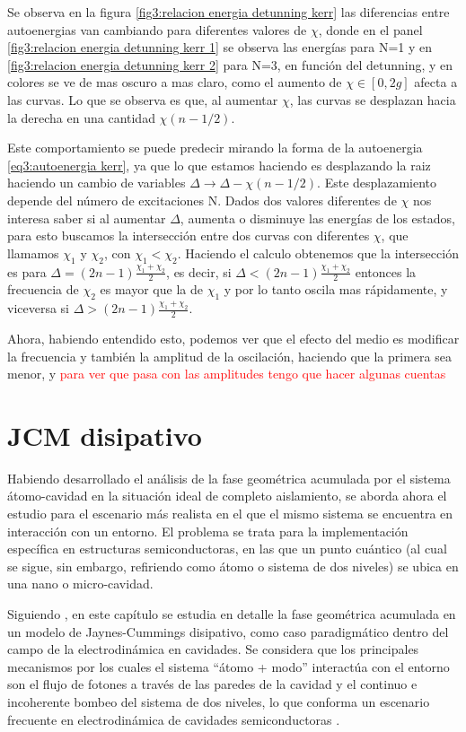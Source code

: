 Se observa en la figura \ref{fig3:relacion energia detunning kerr} las diferencias entre autoenergias van cambiando para diferentes valores de $\chi$, donde en el panel \ref{fig3:relacion energia detunning kerr 1} se observa las energías para N=1 y en \ref{fig3:relacion energia detunning kerr 2} para N=3, en función del detunning, y en colores se ve de mas oscuro a mas claro, como el aumento de $\chi \in [0,2g]$ afecta a las curvas. Lo que se observa es que, al aumentar $\chi$, las curvas se desplazan hacia la derecha en una cantidad $\chi(n-1/2)$. 

Este comportamiento se puede predecir mirando la forma de la autoenergia \ref{eq3:autoenergia kerr}, ya que lo que estamos haciendo es desplazando la raiz haciendo un cambio de variables $\Delta \rightarrow \Delta - \chi(n-1/2)$. Este desplazamiento depende del número de excitaciones N. 
Dados dos valores diferentes de $\chi$ nos interesa saber si al aumentar $\Delta$, aumenta o disminuye las energías de los estados, para esto buscamos la intersección entre dos curvas con diferentes $\chi$, que llamamos $\chi_1$ y $\chi_2$, con $\chi_1<\chi_2$. Haciendo el calculo obtenemos que la intersección es para $\Delta=(2n-1)\frac{\chi_1+\chi_2}{2}$, es decir, si $\Delta<(2n-1)\frac{\chi_1+\chi_2}{2}$ entonces la frecuencia de $\chi_2$ es mayor que la de $\chi_1$ y por lo tanto oscila mas rápidamente, y viceversa si $\Delta>(2n-1)\frac{\chi_1+\chi_2}{2}$.

Ahora, habiendo entendido esto, podemos ver que el efecto del medio es modificar la frecuencia y también la amplitud de la oscilación, haciendo que la primera sea menor, y \textcolor{red}{para ver que pasa con las amplitudes tengo que hacer algunas cuentas}


\section{JCM disipativo}


Habiendo desarrollado el análisis de la fase geométrica acumulada por el sistema átomo-cavidad en la situación ideal de completo aislamiento, se aborda ahora el estudio para el escenario más realista en el que el mismo sistema se encuentra en interacción con un entorno. El problema se trata para la implementación específica en estructuras semiconductoras, en las que un punto cuántico (al cual se sigue, sin embargo, refiriendo como átomo o sistema de dos niveles) se ubica en una nano o micro-cavidad.

Siguiendo \cite{80}, en este capítulo se estudia en detalle la fase geométrica acumulada en un modelo de Jaynes-Cummings disipativo, como caso paradigmático dentro del campo de la electrodinámica en cavidades. Se considera que los principales mecanismos por los cuales el sistema “átomo + modo” interactúa con el entorno son el flujo de fotones a través de las paredes de la cavidad y el continuo e incoherente bombeo del sistema de dos niveles, lo que conforma un escenario frecuente en electrodinámica de cavidades semiconductoras \cite{81,82,83}. 

